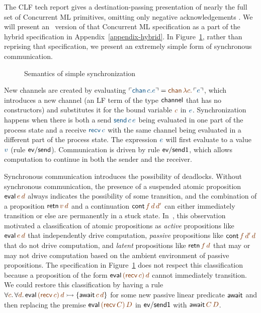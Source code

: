 The CLF tech report gives a destination-passing presentation of
nearly the full set of Concurrent ML primitives, omitting only
negative acknowledgements \cite{cervesato02concurrent}. We will
present an \sls~version of that Concurrent ML specification as a part
of the hybrid specification in Appendix~\ref{appendix-hybrid}.
In Figure~\ref{fig:dest-synch}, rather than reprising that
specification, we present an extremely simple form of synchronous
communication.


\begin{figure}
\caption{Semantics of simple synchronization}
\label{fig:dest-synch}
\end{figure}

New channels are created by evaluating $\interp{{\sf chan}\,c.e} =
\lf{{\sf chan}\,\lambda c.\,\interp{e}}$, which introduces a new channel
(an LF term of the type ${\sf channel}$ that has no constructors) and
substitutes it for the bound variable $\lf{c}$ in $\obj{e}$. 
Synchronization happens when
there is both a send $\obj{{\sf send}\,c\,e}$ being evaluated
in one part of the process state and a
receive $\obj{{\sf recv}\,c}$ with the same
channel being evaluated in a different part of the process state. 
The expression $\obj{e}$ will first evaluate to a value $\obj{v}$ 
(rule ${\sf ev/send}$). Communication is
driven by rule ${\sf ev/send1}$, which allows computation to continue
in both the sender and the receiver.

Synchronous communication introduces the possibility of
deadlocks. Without synchronous communication, the presence of a
suspended atomic proposition ${\sf eval}\,\lf{e}\,\lf{d}$ always
indicates the possibility of some transition, and the combination of a
proposition ${\sf retn}\,\lf{v}\,\lf{d}$ and a continuation ${\sf
  cont}\,\lf{f}\,\lf{d}\,\lf{d'}$ can either immediately transition or
else are permanently in a stuck
state. In~\cite{pfenning09substructural}, this observation motivated a
classification of atomic propositions as {\it active} propositions
like ${\sf eval}\,\lf{e}\,\lf{d}$ that independently drive
computation, {\it passive} propositions like ${\sf
  cont}\,\lf{f}\,\lf{d'}\,\lf{d}$ that do not drive computation, and
{\it latent} propositions like ${\sf retn}\,\lf{f}\,\lf{d}$ that may
or may not drive computation based on the ambient environment of
passive propositions. The specification in Figure~\ref{fig:dest-synch}
does not respect this classification because a proposition of the form
${\sf eval}\,\lf{({\sf recv}\,c)}\,\lf{d}$ cannot immediately
transition. We could restore this classification by having a rule
$\forall \lf{c}.\,\forall \lf{d}.\, {\sf eval}\,\lf{({\sf
    recv}\,c)}\,\lf{d} \lefti \{ {\sf await}\,\lf{c}\,\lf{d} \}$ for
some new passive linear predicate ${\sf await}$ and then replacing the
premise ${\sf eval}\,\lf{({\sf recv}\,C)}\,\lf{D}$ in ${\sf ev/send1}$
with ${\sf await}\,\lf{C}\,\lf{D}$.

